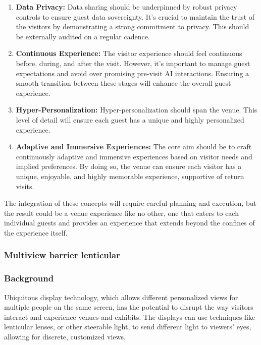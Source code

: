 \begin{enumerate}
\item \textbf{Data Privacy:} Data sharing should be underpinned by robust privacy controls to ensure guest data sovereignty. It's crucial to maintain the trust of the visitors by demonstrating a strong commitment to privacy. This should be externally audited on a regular cadence.
\item \textbf{Continuous Experience:} The visitor experience should feel continuous before, during, and after the visit. However, it's important to manage guest expectations and avoid over promising pre-visit AI interactions. Ensuring a smooth transition between these stages will enhance the overall guest experience.
\item \textbf{Hyper-Personalization:} Hyper-personalization should span the venue. This level of detail will ensure each guest has a unique and highly personalized experience.
\item \textbf{Adaptive and Immersive Experiences:} The core aim should be to craft continuously adaptive and immersive experiences based on visitor needs and implied preferences. By doing so, the venue can ensure each visitor has a unique, enjoyable, and highly memorable experience, supportive of return visits.
\end{enumerate}

The integration of these concepts will require careful planning and execution, but the result could be a venue experience like no other, one that caters to each individual guests and provides an experience that extends beyond the confines of the experience itself.
\subsubsection{Multiview barrier lenticular}
\subsubsection{Background}
Ubiquitous display technology, which allows different personalized views for multiple people on the same screen, has the potential to disrupt the way visitors interact and experience venues and exhibits. The displays can use techniques like lenticular lenses, or other steerable light, to send different light to viewers' eyes, allowing for discrete, customized views. 

